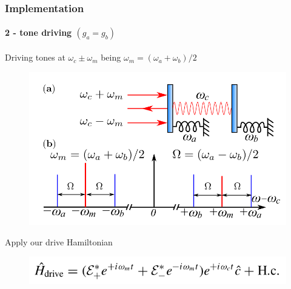 \documentclass[aspectratio=43]{beamer}
\begin{document}
\begin{frame}

	\frametitle{Implementation}
	\framesubtitle{2 - tone driving $(g_{a} = g_{b})$}
	
	Driving tones at $\omega_{c} \pm \omega_{m}$ being  $\omega_{m} = (\omega_{a} + \omega_{b}) / 2$
	
	\begin{figure}
		\includegraphics[width = 7 cm]{plots/plot_2_tone.png}
	\end{figure}	

	Apply our drive Hamiltonian

	\begin{figure}
		\includegraphics[width = 7 cm]{plots/hamiltonian_2_tone.png}
	\end{figure}

\end{frame}
\end{document}
